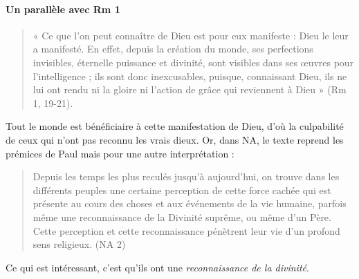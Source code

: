 \paragraph{Un parallèle avec Rm 1}

   \begin{quote}
       « Ce que l’on peut connaître de Dieu est pour eux manifeste : Dieu le leur a manifesté. En effet, depuis la création du monde, ses perfections invisibles, éternelle puissance et divinité, sont visibles dans ses œuvres pour l’intelligence ; ils sont donc inexcusables, puisque, connaissant Dieu, ils ne lui ont rendu ni la gloire ni l’action de grâce qui reviennent à Dieu » (Rm 1, 19-21).


   \end{quote}
   
   Tout le monde est bénéficiaire à cette manifestation de Dieu, d’où la culpabilité de ceux qui n’ont pas reconnu les vrais dieux. Or, dans NA, le texte reprend les prémices de Paul mais pour une autre interprétation : 
   \begin{quote}
       Depuis les temps les plus reculés jusqu’à aujourd’hui, on trouve dans les différents peuples une certaine perception de cette force cachée qui est présente au cours des choses et aux événements de la vie humaine, parfois même une reconnaissance de la Divinité suprême, ou même d’un Père. Cette perception et cette reconnaissance pénètrent leur vie d’un profond sens religieux. (NA 2)
   \end{quote}

Ce qui est intéressant, c’est qu’ils ont une \textit{reconnaissance de la divinité}.

